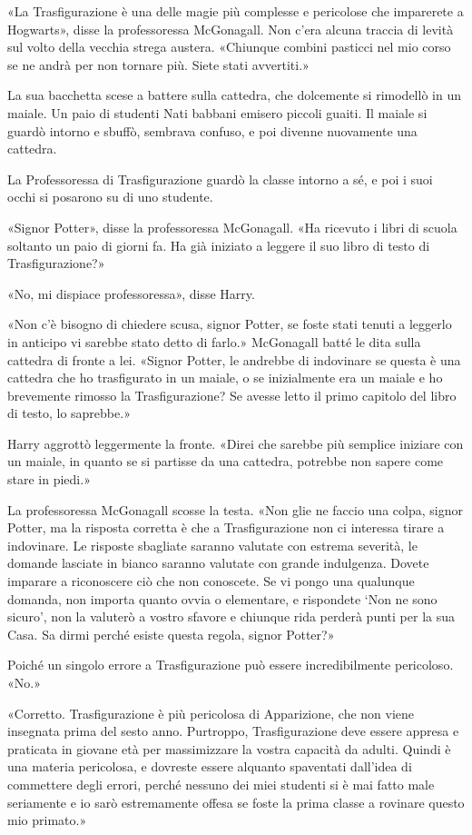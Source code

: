 «La Trasfigurazione è una delle magie più complesse e pericolose che imparerete a Hogwarts», disse la professoressa McGonagall. Non c’era alcuna traccia di levità sul volto della vecchia strega austera. «Chiunque combini pasticci nel mio corso se ne andrà per non tornare più. Siete stati avvertiti.»

La sua bacchetta scese a battere sulla cattedra, che dolcemente si rimodellò in un maiale. Un paio di studenti Nati babbani emisero piccoli guaiti. Il maiale si guardò intorno e sbuffò, sembrava confuso, e poi divenne nuovamente una cattedra.

La Professoressa di Trasfigurazione guardò la classe intorno a sé, e poi i suoi occhi si posarono su di uno studente.

«Signor Potter», disse la professoressa McGonagall. «Ha ricevuto i libri di scuola soltanto un paio di giorni fa. Ha già iniziato a leggere il suo libro di testo di Trasfigurazione?»

«No, mi dispiace professoressa», disse Harry.

«Non c’è bisogno di chiedere scusa, signor Potter, se foste stati tenuti a leggerlo in anticipo vi sarebbe stato detto di farlo.» McGonagall batté le dita sulla cattedra di fronte a lei. «Signor Potter, le andrebbe di indovinare se questa è una cattedra che ho trasfigurato in un maiale, o se inizialmente era un maiale e ho brevemente rimosso la Trasfigurazione? Se avesse letto il primo capitolo del libro di testo, lo saprebbe.»

Harry aggrottò leggermente la fronte. «Direi che sarebbe più semplice iniziare con un maiale, in quanto se si partisse da una cattedra, potrebbe non sapere come stare in piedi.»

La professoressa McGonagall scosse la testa. «Non glie ne faccio una colpa, signor Potter, ma la risposta corretta è che a Trasfigurazione non ci interessa tirare a indovinare. Le risposte sbagliate saranno valutate con estrema severità, le domande lasciate in bianco saranno valutate con grande indulgenza. Dovete imparare a riconoscere ciò che non conoscete. Se vi pongo una qualunque domanda, non importa quanto ovvia o elementare, e rispondete ‘Non ne sono sicuro’, non la valuterò a vostro sfavore e chiunque rida perderà punti per la sua Casa. Sa dirmi perché esiste questa regola, signor Potter?»

Poiché un singolo errore a Trasfigurazione può essere incredibilmente pericoloso. «No.»

«Corretto. Trasfigurazione è più pericolosa di Apparizione, che non viene insegnata prima del sesto anno. Purtroppo, Trasfigurazione deve essere appresa e praticata in giovane età per massimizzare la vostra capacità da adulti. Quindi è una materia pericolosa, e dovreste essere alquanto spaventati dall’idea di commettere degli errori, perché nessuno dei miei studenti si è mai fatto male seriamente e io sarò estremamente offesa se foste la prima classe a rovinare questo mio primato.»

